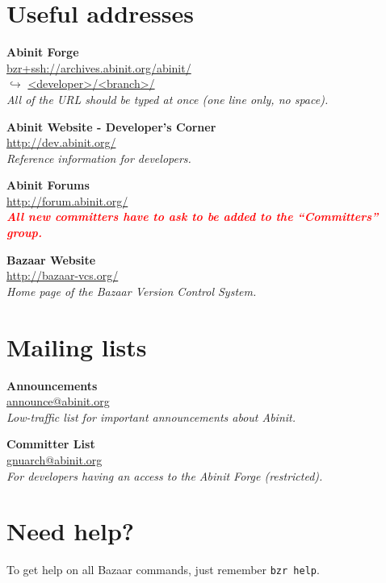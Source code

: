 \documentclass[tumble,foldmark,a4paper]{leaflet}
\begin{document}
\newpage

\section*{Useful addresses}

\begin{center}
\textbf{Abinit Forge} \\
\url{bzr+ssh://archives.abinit.org/abinit/} \\
$\hookrightarrow$ \url{<developer>/<branch>/} \\
\textit{All of the URL should be typed at once (one line only, no space).}
\end{center}

\begin{center}
\textbf{Abinit Website - Developer's Corner} \\
\url{http://dev.abinit.org/} \\
\textit{Reference information for developers.}
\end{center}

\begin{center}
\textbf{Abinit Forums} \\
\url{http://forum.abinit.org/} \\
\textit{\textbf{\textcolor{red}{All new committers have to ask to be
added to the ``Committers'' group.}}}
\end{center}

\begin{center}
\textbf{Bazaar Website} \\
\url{http://bazaar-vcs.org/} \\
\textit{Home page of the Bazaar Version Control System.}
\end{center}

\section*{Mailing lists}

\begin{center}
\textbf{Announcements} \\
\url{announce@abinit.org} \\
\textit{Low-traffic list for important announcements about Abinit.}
\end{center}

\begin{center}
\textbf{Committer List} \\
\url{gnuarch@abinit.org} \\
\textit{For developers having an access to the Abinit Forge (restricted).}
\end{center}

\section*{Need help?}

To get help on all Bazaar commands, just remember \texttt{bzr~help}.
\end{document}
